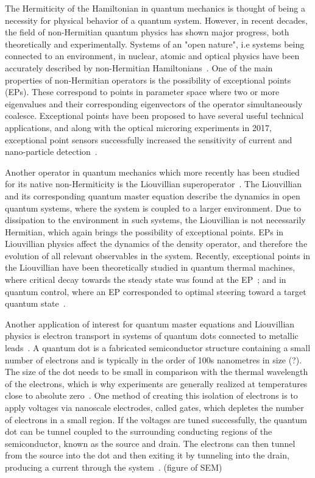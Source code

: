 \documentclass[../main.tex]{subfiles}
\begin{document}
The Hermiticity of the Hamiltonian in quantum mechanics is thought of being a necessity for physical behavior of a quantum system. However, in recent decades, the field of non-Hermitian quantum physics has shown major progress, both theoretically and experimentally. Systems of an "open nature", i.e systems being connected to an environment, in nuclear, atomic and optical physics have been accurately described by non-Hermitian Hamiltonians~\cite{nonHermrev}. One of the main properties of non-Hermitian operators is the possibility of exceptional points (EPs). These correspond to points in parameter space where two or more eigenvalues and their corresponding eigenvectors of the operator simultaneously coalesce. Exceptional points have been proposed to have several useful technical applications, and along with the optical microring experiments in 2017, exceptional point sensors successfully increased the sensitivity of current and nano-particle detection~\cite{microring1, microring2}.

Another operator in quantum mechanics which more recently has been studied for its native non-Hermiticity is the Liouvillian superoperator~\cite{recentliou, thermal, steering}. The Liouvillian and its corresponding quantum master equation describe the dynamics in open quantum systems, where the system is coupled to a larger environment. Due to dissipation to the environment in such systems, the Liouvillian is not necessarily Hermitian, which again brings the possibility of exceptional points. EPs in Liouvillian physics affect the dynamics of the density operator, and therefore the evolution of all relevant observables in the system. Recently, exceptional points in the Liouvillian have been theoretically studied in quantum thermal machines, where critical decay towards the steady state was found at the EP~\cite{thermal}; and in quantum control, where an EP corresponded to optimal steering toward a target quantum state~\cite{steering}. 

Another application of interest for quantum master equations and Liouvillian physics is electron transport in systems of quantum dots connected to metallic leads~\cite{qdottrans}. A quantum dot is a fabricated semiconductor structure containing a small number of electrons and is typically in the order of 100s nanometres in size (?). The size of the dot needs to be small in comparison with the thermal wavelength of the electrons, which is why experiments are generally realized at temperatures close to absolute zero~\cite{transport}. One method of creating this isolation of electrons is to apply voltages via nanoscale electrodes, called gates, which depletes the number of electrons in a small region. If the voltages are tuned successfully, the quantum dot can be tunnel coupled to the surrounding conducting regions of the semiconductor, known as the source and drain. The electrons can then tunnel from the source into the dot and then exiting it by tunneling into the drain, producing a current through the system~\cite{qdotmarcus}. (figure of SEM)
\end{document}
